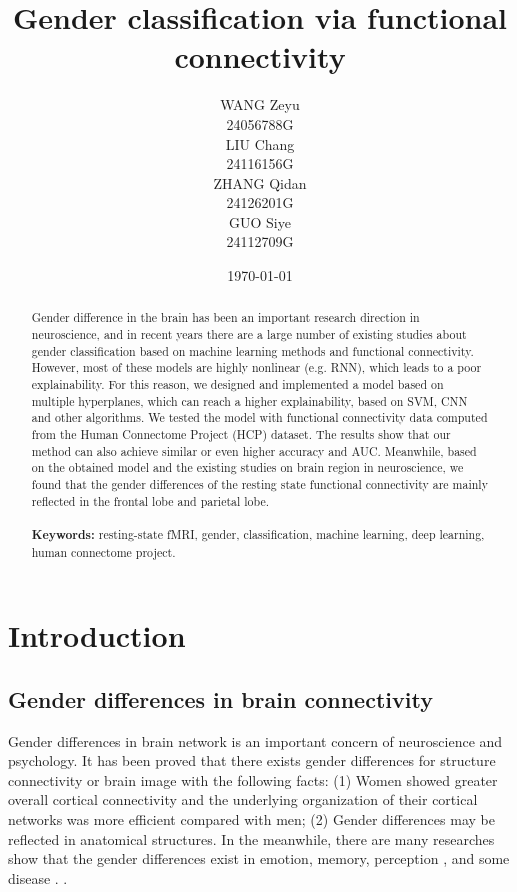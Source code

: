 \documentclass[11pt]{article}
\title{\Huge Gender classification via functional connectivity}
\author{
    \parbox{0.2\textwidth}{
        \centering WANG Zeyu \\
        \centering 24056788G
    }
    \parbox{0.2\textwidth}{
        \centering LIU Chang \\
        \centering 24116156G
    }
    \parbox{0.2\textwidth}{
        \centering ZHANG Qidan \\
        \centering 24126201G
    }
    \parbox{0.2\textwidth}{
        \centering GUO Siye \\
        \centering 24112709G
    }
}
\date{\today}
\begin{document}
\maketitle

\begin{abstract}
    Gender difference in the brain has been an important research direction in neuroscience, and in recent years there are a large number of existing studies about gender classification based on machine learning methods and functional connectivity. However, most of these models are highly nonlinear (e.g. RNN), which leads to a poor explainability. For this reason, we designed and implemented a model based on multiple hyperplanes, which can reach a higher explainability, based on SVM, CNN and other algorithms. We tested the model with functional connectivity data computed from the Human Connectome Project (HCP) dataset. The results show that our method can also achieve similar or even higher accuracy and AUC. Meanwhile, based on the obtained model and the existing studies on brain region in neuroscience, we found that the gender differences of the resting state functional connectivity are mainly reflected in the frontal lobe and parietal lobe.
    \\\\
    \textbf{Keywords:} resting-state fMRI, gender, classification, machine learning, deep learning, human connectome project.
\end{abstract}


\newpage

\tableofcontents
\thispagestyle{empty}
\setcounter{page}{0}

\newpage

\section{Introduction}

\subsection{Gender differences in brain connectivity}

Gender differences in brain network is an important concern of neuroscience and psychology. It has been proved that there exists gender differences for structure connectivity or brain image\cite{Gong2009-gu}\cite{Dibaji2023-bn}\cite{Ebel2023-pu} with the following facts: (1) Women showed greater overall cortical connectivity and the underlying organization of their cortical networks was more efficient compared with men; (2) Gender differences may be reflected in anatomical structures. In the meanwhile, there are many researches show that the gender differences exist in emotion\cite{chaplin2013gender}\cite{fischer2018gender}, memory\cite{guillem2005gender}, perception \cite{skaalvik1994gender}\cite{soetanto2006there}\cite{wiesenfeld2005sex}, and some disease \cite{Sendi2023-nu}\cite{Yan2019-yc}. .
\end{document}
